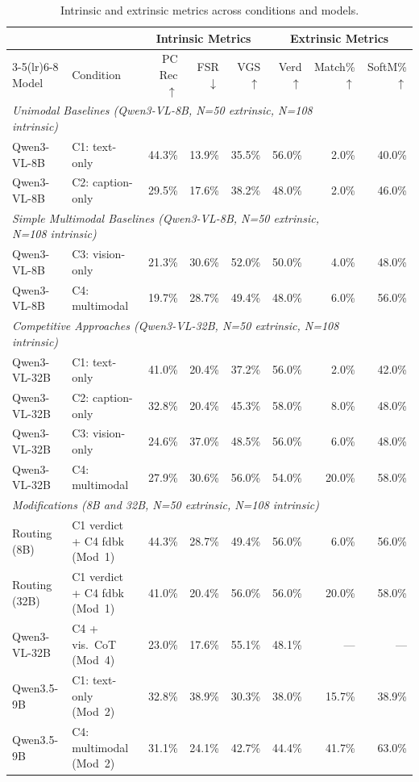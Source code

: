 \documentclass{article}
\begin{document}
\begin{table}[t]
\centering
\scriptsize
\setlength{\tabcolsep}{4pt}
\begin{tabular}{@{}llrrrrrr@{}}
\toprule
& & \multicolumn{3}{c}{Intrinsic Metrics} & \multicolumn{3}{c}{Extrinsic Metrics} \\
\cmidrule(lr){3-5}\cmidrule(lr){6-8}
Model & Condition
  & PC Rec $\uparrow$
  & FSR $\downarrow$
  & VGS $\uparrow$
  & Verd $\uparrow$
  & Match\% $\uparrow$
  & SoftM\% $\uparrow$ \\
\midrule
\multicolumn{7}{l}{\textit{Unimodal Baselines (Qwen3-VL-8B, N=50 extrinsic, N=108 intrinsic)}} \\
Qwen3-VL-8B & C1: text-only    & 44.3\% & 13.9\% & 35.5\% & 56.0\% & 2.0\% & 40.0\% \\
Qwen3-VL-8B & C2: caption-only & 29.5\% & 17.6\% & 38.2\% & 48.0\% & 2.0\% & 46.0\% \\
\midrule
\multicolumn{7}{l}{\textit{Simple Multimodal Baselines (Qwen3-VL-8B, N=50 extrinsic, N=108 intrinsic)}} \\
Qwen3-VL-8B & C3: vision-only  & 21.3\% & 30.6\% & 52.0\% & 50.0\% & 4.0\% & 48.0\% \\
Qwen3-VL-8B & C4: multimodal   & 19.7\% & 28.7\% & 49.4\% & 48.0\% & 6.0\% & 56.0\% \\
\midrule
\multicolumn{7}{l}{\textit{Competitive Approaches (Qwen3-VL-32B, N=50 extrinsic, N=108 intrinsic)}} \\
Qwen3-VL-32B & C1: text-only    & 41.0\% & 20.4\% & 37.2\% & 56.0\% & 2.0\% & 42.0\% \\
Qwen3-VL-32B & C2: caption-only & 32.8\% & 20.4\% & 45.3\% & 58.0\% & 8.0\% & 48.0\% \\
Qwen3-VL-32B & C3: vision-only  & 24.6\% & 37.0\% & 48.5\% & 56.0\% & 6.0\% & 48.0\% \\
Qwen3-VL-32B & C4: multimodal   & 27.9\% & 30.6\% & 56.0\% & 54.0\% & 20.0\% & 58.0\% \\
\midrule
\multicolumn{7}{l}{\textit{Modifications (8B and 32B, N=50 extrinsic, N=108 intrinsic)}} \\
Routing (8B)  & C1 verdict + C4 fdbk (Mod~1) & 44.3\% & 28.7\% & 49.4\% & 56.0\% & 6.0\% & 56.0\% \\
Routing (32B) & C1 verdict + C4 fdbk (Mod~1) & 41.0\% & 20.4\% & 56.0\% & 56.0\% & 20.0\% & 58.0\% \\
Qwen3-VL-32B & C4 + vis.\ CoT (Mod~4) & 23.0\% & 17.6\% & 55.1\% & 48.1\% & --- & --- \\
Qwen3.5-9B   & C1: text-only (Mod~2)  & 32.8\% & 38.9\% & 30.3\% & 38.0\% & 15.7\% & 38.9\% \\
Qwen3.5-9B   & C4: multimodal (Mod~2) & 31.1\% & 24.1\% & 42.7\% & 44.4\% & 41.7\% & 63.0\% \\
\bottomrule
\end{tabular}
\caption{ Intrinsic and extrinsic metrics across conditions and models.}
\label{tab:intrinsic}
\end{table}
\end{document}
